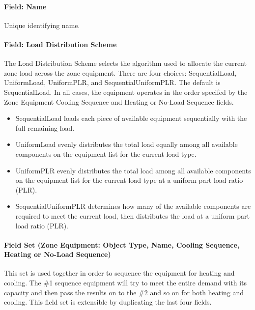\paragraph{Field: Name}\label{field-name-1-050}

Unique identifying name.

\paragraph{Field: Load Distribution Scheme}\label{field-load-distribution-scheme-000}

The Load Distribution Scheme selects the algorithm used to allocate the current zone load across the zone equipment. There are four choices: SequentialLoad, UniformLoad, UniformPLR, and SequentialUniformPLR. The default is SequentialLoad. In all cases, the equipment operates in the order specifed by the Zone Equipment Cooling Sequence and Heating or No-Load Sequence fields.

\begin{itemize}
\item
  SequentialLoad loads each piece of available equipment sequentially with the full remaining load.
\item
  UniformLoad evenly distributes the total load equally among all available components on the equipment list for the current load type.
\item
  UniformPLR evenly distributes the total load among all available components on the equipment list for the current load type at a uniform part load ratio (PLR).
\item
  SequentialUniformPLR determines how many of the available components are required to meet the current load, then distributes the load at a uniform part load ratio (PLR).
\end{itemize}
\paragraph{Field Set (Zone Equipment: Object Type, Name, Cooling Sequence, Heating or No-Load Sequence)}\label{field-set-zone-equipment-object-type-name-cooling-sequence-heating-or-no-load-sequence}

This set is used together in order to sequence the equipment for heating and cooling. The \#1 sequence equipment will try to meet the entire demand with its capacity and then pass the results on to the \#2 and so on for both heating and cooling. This field set is extensible by duplicating the last four fields.

